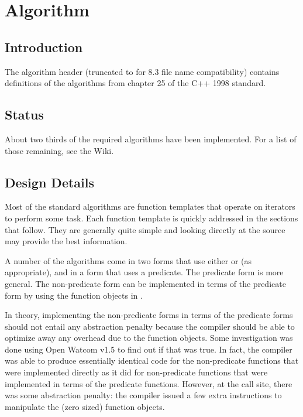 
\chapter{Algorithm}

\section{Introduction}

The algorithm header (truncated to  for 8.3 file name
compatibility) contains definitions of the algorithms from chapter 25 of the
C++ 1998 standard.

\section{Status}

About two thirds of the required algorithms have been implemented. For a list
of those remaining, see the Wiki.

\section{Design Details}

Most of the standard algorithms are function templates that operate on
iterators to perform some task. Each function template is quickly addressed in
the sections that follow. They are generally quite simple and looking directly
at the source may provide the best information.


A number of the algorithms come in two forms that use either 
or  (as appropriate), and in a form that uses a predicate.
The predicate form is more general. The non-predicate form can be implemented
in terms of the predicate form by using the function objects in
.

In theory, implementing the non-predicate forms in terms of the predicate
forms should not entail any abstraction penalty because the compiler should be
able to optimize away any overhead due to the function objects. Some
investigation was done using Open Watcom v1.5 to find out if that was true. In
fact, the compiler was able to produce essentially identical code for the
non-predicate functions that were implemented directly as it did for
non-predicate functions that were implemented in terms of the predicate
functions. However, at the call site, there was some abstraction penalty: the
compiler issued a few extra instructions to manipulate the (zero sized)
function objects.

